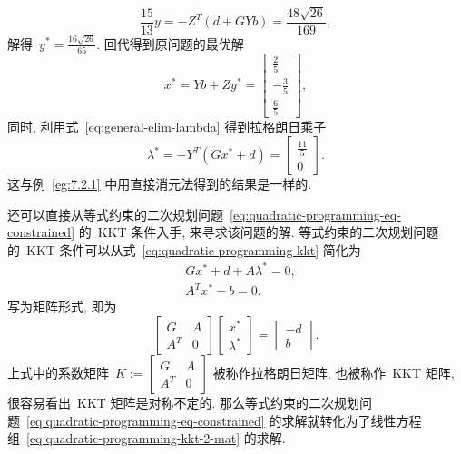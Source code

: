 \begin{exam}
\begin{equation*}
\frac{15}{13} y = - Z^T \left( d + G Y b \right) = \frac{48 \sqrt{26}}{169},
\end{equation*}
解得~$y^* = \frac{16 \sqrt{26}}{65}.$ 回代得到原问题的最优解
\begin{equation*}
{x}^* = Y {b} + Z y^* = \left[\begin{matrix} \frac{2}{5} \\ - \frac{3}{5} \\ \frac{6}{5} \end{matrix}\right],
\end{equation*}
同时, 利用式~\eqref{eq:general-elim-lambda} 得到拉格朗日乘子
\begin{equation*}
{\lambda}^* = - Y^T \left( G {x}^* + {d} \right) = \left[\begin{matrix} \frac{11}{5} \\ 0 \end{matrix}\right].
\end{equation*}
这与例~\eqref{eg:7.2.1} 中用直接消元法得到的结果是一样的.
\end{exam}

还可以直接从等式约束的二次规划问题~\eqref{eq:quadratic-programming-eq-constrained} 的~KKT 条件入手,  来寻求该问题的解. 等式约束的二次规划问题的~KKT 条件可以从式~\eqref{eq:quadratic-programming-kkt} 简化为
\begin{equation}
\label{eq:quadratic-programming-kkt-2}
\begin{aligned}
& G {x}^* + {d} + A {\lambda}^* = {0}, \\
& A^T {x}^* - {b} = {0}.
\end{aligned}
\end{equation}
写为矩阵形式, 即为
\begin{equation}
\label{eq:quadratic-programming-kkt-2-mat}
\begin{bmatrix} G & A \\ A^T & 0 \end{bmatrix} \begin{bmatrix} {x}^* \\ {\lambda}^* \end{bmatrix} = \begin{bmatrix} -{d} \\ {b} \end{bmatrix}.
\end{equation}
上式中的系数矩阵~$K := \begin{bmatrix} G & A \\ A^T & 0 \end{bmatrix}$ 被称作拉格朗日矩阵,
也被称作~KKT 矩阵, 很容易看出~KKT 矩阵是对称不定的.
那么等式约束的二次规划问题~\eqref{eq:quadratic-programming-eq-constrained} 的求解就转化为了线性方程组~\eqref{eq:quadratic-programming-kkt-2-mat} 的求解.

